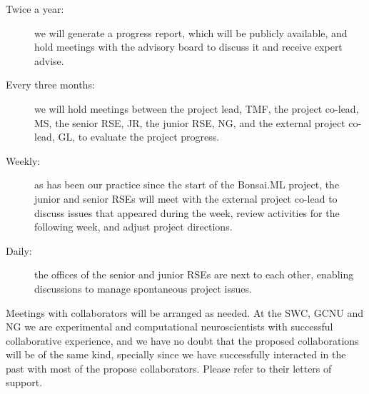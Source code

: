 \begin{description}

    \item[Twice a year:] we will generate a progress report, which will be
        publicly available, and hold meetings with the advisory board to
        discuss it and receive expert advise.

    \item[Every three months:] we will hold meetings between the project lead, TMF, the
        project co-lead, MS, the senior RSE, JR, the junior RSE, NG, and
        the external project co-lead, GL, to evaluate the project progress.

    \item[Weekly:] as has been our practice since the start of the Bonsai.ML
        project, the junior and senior RSEs will meet with the external project
        co-lead to discuss issues that appeared during the week, review
        activities for the following week, and adjust project directions.

    \item[Daily:] the offices of the senior and junior RSEs are next to each
        other, enabling discussions to manage spontaneous project issues.

\end{description}

Meetings with collaborators will be arranged as needed.
%
At the SWC, GCNU and NG we are experimental and computational neuroscientists
with successful collaborative experience, and we have no doubt that the
proposed collaborations will be of the same kind,
%
specially since we have successfully interacted in the past with most of the
propose collaborators.
%
Please refer to their letters of support.
